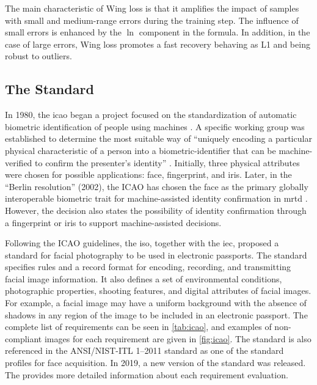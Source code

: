 The main characteristic of Wing loss is that it amplifies the impact of samples with small and medium-range errors during the training step. The influence of small errors is enhanced by the $\ln$ component in the formula. In addition, in the case of large errors, Wing loss promotes a fast recovery behaving as L1 and being robust to outliers.

\subsection{The \icao Standard}

In 1980, the \acf{icao} began a project focused on the standardization of automatic biometric identification of people using machines \citep{icao2003report}. A specific working group was established to determine the most suitable way of ``uniquely encoding a particular physical characteristic of a person into a biometric-identifier that can be machine-verified to confirm the presenter's identity'' \citep{icao2003report}. Initially, three physical attributes were chosen for possible applications: face, fingerprint, and iris. Later, in the ``Berlin resolution'' (2002), the ICAO has chosen the face as the primary globally interoperable biometric trait for machine-assisted identity confirmation in \acf{mrtd} \citep{ferrara2012face}. However, the decision also states the possibility of identity confirmation through a fingerprint or iris to support machine-assisted decisions.

Following the ICAO guidelines, the \acf{iso}, together with the \acf{iec}, proposed a standard for facial photography to be used in electronic passports. The \icao \citep{iso-iec} standard specifies rules and a record format for encoding, recording, and transmitting facial image information. It also defines a set of environmental conditions, photographic properties, shooting features, and digital attributes of facial images. For example, a facial image may have a uniform background with the absence of shadows in any region of the image to be included in an electronic passport. The complete list of requirements can be seen in \autoref{tab:icao}, and examples of non-compliant images for each requirement are given in \autoref{fig:icao}. The \icao standard is also referenced in the ANSI/NIST-ITL 1–2011 standard \citep{nist2011} as one of the standard profiles for face acquisition. In 2019, a new version of the \icao standard was released. The \icaonew provides more detailed information about each requirement evaluation.

